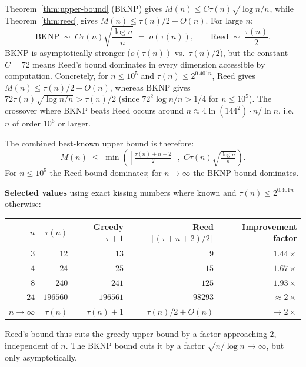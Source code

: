 \begin{remark}\label{rem:comparison}
Theorem~\ref{thm:upper-bound} (BKNP) gives $M(n)\le C\tau(n)\sqrt{\log n/n}$, while Theorem~\ref{thm:reed} gives $M(n)\le\tau(n)/2 + O(n)$.  For large $n$:
\[
  \text{BKNP} \;\sim\; C\tau(n)\sqrt{\frac{\log n}{n}} \;=\; o(\tau(n)),
  \qquad
  \text{Reed} \;\sim\; \frac{\tau(n)}{2}.
\]
BKNP is asymptotically stronger ($o(\tau(n))$ vs.\ $\tau(n)/2$), but the constant $C=72$ means Reed's bound dominates in every dimension accessible by computation.  Concretely, for $n\le 10^5$ and $\tau(n)\le 2^{0.401n}$, Reed gives $M(n)\le\tau(n)/2+O(n)$, whereas BKNP gives $72\tau(n)\sqrt{\log n/n}>\tau(n)/2$ (since $72^2\log n/n > 1/4$ for $n\le 10^5$).  The crossover where BKNP beats Reed occurs around $n\approx 4\ln(144^2)\cdot n/\ln n$, i.e.\ $n$ of order $10^6$ or larger.

The combined best-known upper bound is therefore:
\[
  M(n)\;\le\;\min\!\left(\left\lceil\tfrac{\tau(n)+n+2}{2}\right\rceil,\;C\tau(n)\sqrt{\tfrac{\log n}{n}}\right).
\]
For $n\le 10^5$ the Reed bound dominates; for $n\to\infty$ the BKNP bound dominates.

\textbf{Selected values} using exact kissing numbers where known and $\tau(n)\le 2^{0.401n}$ otherwise:

\smallskip
\begin{center}
\begin{tabular}{r|r|r|r|r}
$n$ & $\tau(n)$ & Greedy $\tau+1$ & Reed $\lceil(\tau+n+2)/2\rceil$ & Improvement factor\\
\hline
$3$ & $12$ & $13$ & $9$ & $1.44\times$\\
$4$ & $24$ & $25$ & $15$ & $1.67\times$\\
$8$ & $240$ & $241$ & $125$ & $1.93\times$\\
$24$ & $196560$ & $196561$ & $98293$ & $\approx 2\times$\\
$n\to\infty$ & $\tau(n)$ & $\tau(n)+1$ & $\tau(n)/2+O(n)$ & $\to 2\times$\\
\end{tabular}
\end{center}
\smallskip

Reed's bound thus cuts the greedy upper bound by a factor approaching $2$, independent of $n$.  The BKNP bound cuts it by a factor $\sqrt{n/\log n}\to\infty$, but only asymptotically.
\end{remark}

